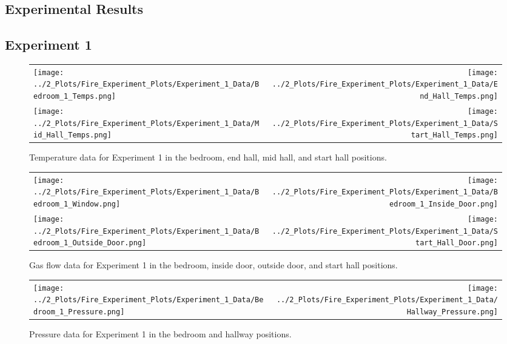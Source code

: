 \documentclass[12pt,oneside]{book}
\begin{document}
\begin{appendices}

\section*{Experimental Results} \label{App:Results}

\subsection*{Experiment 1}
\label{app:Experiment_1}

\begin{figure}[!ht]
\begin{tabular*}{\textwidth}{lr}
\texttt{[image: ../2\_Plots/Fire\_Experiment\_Plots/Experiment\_1\_Data/Bedroom\_1\_Temps.png]} &
\texttt{[image: ../2\_Plots/Fire\_Experiment\_Plots/Experiment\_1\_Data/End\_Hall\_Temps.png]} \\
\texttt{[image: ../2\_Plots/Fire\_Experiment\_Plots/Experiment\_1\_Data/Mid\_Hall\_Temps.png]} &
\texttt{[image: ../2\_Plots/Fire\_Experiment\_Plots/Experiment\_1\_Data/Start\_Hall\_Temps.png]} \\
\end{tabular*}
\caption[Experiment 1 Temperatures]{Temperature data for Experiment 1 in the bedroom, end hall, mid hall, and start hall positions.}
\end{figure}

\clearpage

\begin{figure}[!ht]
\begin{tabular*}{\textwidth}{lr}
\texttt{[image: ../2\_Plots/Fire\_Experiment\_Plots/Experiment\_1\_Data/Bedroom\_1\_Window.png]} &
\texttt{[image: ../2\_Plots/Fire\_Experiment\_Plots/Experiment\_1\_Data/Bedroom\_1\_Inside\_Door.png]} \\
\texttt{[image: ../2\_Plots/Fire\_Experiment\_Plots/Experiment\_1\_Data/Bedroom\_1\_Outside\_Door.png]} &
\texttt{[image: ../2\_Plots/Fire\_Experiment\_Plots/Experiment\_1\_Data/Start\_Hall\_Door.png]} \\
\end{tabular*}
\caption[Experiment 1 Gas Flows]{Gas flow data for Experiment 1 in the bedroom, inside door, outside door, and start hall positions.}
\end{figure}

\clearpage

\begin{figure}[!ht]
\begin{tabular*}{\textwidth}{lr}
\texttt{[image: ../2\_Plots/Fire\_Experiment\_Plots/Experiment\_1\_Data/Bedroom\_1\_Pressure.png]} &
\texttt{[image: ../2\_Plots/Fire\_Experiment\_Plots/Experiment\_1\_Data/Hallway\_Pressure.png]} \\
\end{tabular*}
\caption[Experiment 1 Pressures]{Pressure data for Experiment 1 in the bedroom and hallway positions.}
\end{figure}


\end{appendices}
\end{document}
